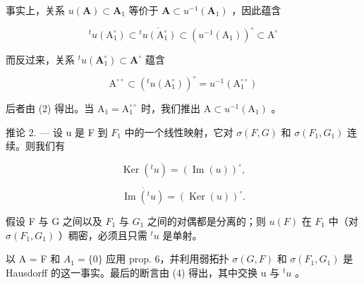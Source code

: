 事实上，关系 \(u(\mathbf{A}) \subset \mathbf{A}_1\) 等价于 \(\mathbf{A} \subset u^{-1}(\mathbf{A}_1)\) ，因此蕴含

\[
{ } ^ { t } u ( \mathrm{A} _ { 1 } ^ { \circ } ) \subset \overline { { { ^ { t } u ( \mathrm{A} _ { 1 } ^ { \circ } ) } } } \subset ( u ^ { - 1 } ( \mathrm{A} _ { 1 } ) ) ^ { \circ } \subset \mathrm{A} ^ { \circ }
\]

而反过来，关系 \({}^t u(\mathbf{A}_1^\circ) \subset \mathbf{A}^\circ\) 蕴含

\[
\mathrm{A} ^ {\circ \circ} \subset \left(^ {t} u (\mathrm{A} _ {1} ^ {\circ})\right) ^ {\circ} = u ^ {- 1} (\mathrm{A} _ {1} ^ {\circ \circ})
\]

后者由 (2) 得出。当 \(\mathrm{A}_1 = \mathrm{A}_1^{\circ \circ}\) 时，我们推出 \(\mathrm{A} \subset u^{-1}(\mathrm{A}_1)\) 。

推论 2. --- 设 u 是 F 到 \(F_{1}\) 中的一个线性映射，它对 \(\sigma(F, G)\) 和 \(\sigma(F_{1}, G_{1})\) 连续。则我们有

\[
\operatorname{Ker} (^ {t} u) = (\operatorname{Im} (u)) ^ {\circ},\tag{3}
\]

\[
\overline {{\operatorname{Im} (^ {t} u)}} = (\operatorname{Ker} (u)) ^ {\circ}.\tag{4}
\]

假设 F 与 G 之间以及 \(F_{1}\) 与 \(G_{1}\) 之间的对偶都是分离的；则 \(u(F)\) 在 \(F_{1}\) 中（对 \(\sigma(F_{1}, G_{1})\) ）稠密，必须且只需 \(^{t}u\) 是单射。

以 A = F 和 \(A_{1} = \{0\}\) 应用 prop. 6，并利用弱拓扑 \(\sigma(G, F)\) 和 \(\sigma(F_{1}, G_{1})\) 是 Hausdorff 的这一事实。最后的断言由 (4) 得出，其中交换 u 与 \(^{t}u\) 。
\relax{}

